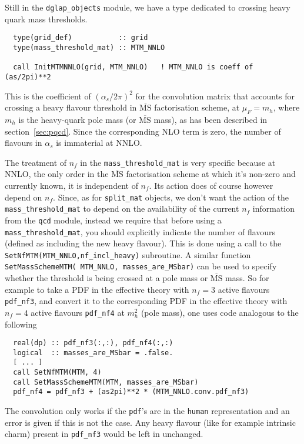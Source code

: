 \documentclass[12pt]{article}
\newcommand{\as}{\alpha_s}
\newcommand{\MSbar}{\overline{\mathrm{MS}}}
\newcommand{\ttt}[1]{\texttt{#1}}
\begin{document}
Still in the \ttt{dglap\_objects} module, we have a type dedicated to
crossing heavy quark mass thresholds.
\begin{lstlisting}
  type(grid_def)           :: grid
  type(mass_threshold_mat) :: MTM_NNLO

  call InitMTMNNLO(grid, MTM_NNLO)   ! MTM_NNLO is coeff of (as/2pi)**2
\end{lstlisting}
This is the coefficient of $(\as/2\pi)^2$ for the convolution matrix
that accounts for crossing a heavy flavour threshold in $\MSbar$
factorisation scheme, at $\mu_F = m_h$, where $m_h$ is the heavy-quark
pole mass (or $\MSbar$ mass), as has been described in
section~\ref{sec:pqcd}. Since the corresponding NLO term is zero, the
number of flavours in $\as$ is immaterial at NNLO.

The treatment of $n_f$ in the \ttt{mass\_threshold\_mat} is very
specific because at NNLO, the only order in the $\MSbar$ factorisation
scheme at which it's non-zero and currently known, it is independent of $n_f$.
Its action does of course however depend on $n_f$. 
%
Since, as for \ttt{split\_mat} objects, we don't want the action of
the \ttt{mass\_threshold\_mat} to depend on the availability of the
current $n_f$ information from the \ttt{qcd} module, instead we
require that before using a \ttt{mass\_threshold\_mat}, you should
explicitly indicate the number of flavours (defined as including the
new heavy flavour).
%
This is done using a call to the
\ttt{SetNfMTM(MTM\_NNLO,nf\_incl\_heavy)} subroutine. A similar function
\ttt{SetMassSchemeMTM( MTM\_NNLO, masses\_are\_MSbar)} can be used to
specify whether the threshold is being crossed at a pole mass or
$\MSbar$ mass.
%
So for example to take a PDF in the effective theory with $n_f=3$
active flavours \ttt{pdf\_nf3}, and convert it to the corresponding
PDF in the effective theory with $n_f=4$ active flavours
\ttt{pdf\_nf4} at $m_h^2$ (pole mass), one uses code analogous to the following
\begin{lstlisting}
  real(dp) :: pdf_nf3(:,:), pdf_nf4(:,:)
  logical  :: masses_are_MSbar = .false.
  [ ... ]
  call SetNfMTM(MTM, 4)
  call SetMassSchemeMTM(MTM, masses_are_MSbar)
  pdf_nf4 = pdf_nf3 + (as2pi)**2 * (MTM_NNLO.conv.pdf_nf3)
\end{lstlisting}
The convolution only works if the \ttt{pdf}'s are in the \ttt{human}
representation and an error is given if this is not the case. Any
heavy flavour (like for example intrinsic charm) 
present in \ttt{pdf\_nf3} would be left in unchanged.
\end{document}
